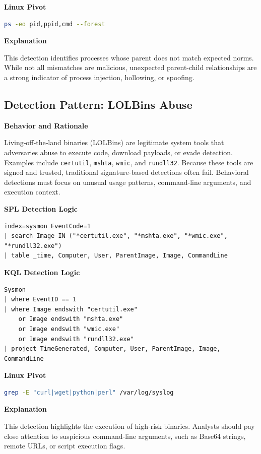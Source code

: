 \textbf{Linux Pivot}
\begin{lstlisting}[language=bash]
ps -eo pid,ppid,cmd --forest
\end{lstlisting}

\textbf{Explanation}

This detection identifies processes whose parent does not match expected norms. While not all mismatches are malicious, 
unexpected parent-child relationships are a strong indicator of process injection, hollowing, or spoofing.

\subsection*{Detection Pattern: LOLBins Abuse}

\textbf{Behavior and Rationale}

Living‑off‑the‑land binaries (LOLBins) are legitimate system tools that adversaries abuse to execute code, download payloads, 
or evade detection. Examples include \texttt{certutil}, \texttt{mshta}, \texttt{wmic}, and \texttt{rundll32}. 
Because these tools are signed and trusted, traditional signature-based detections often fail. Behavioral detections 
must focus on unusual usage patterns, command-line arguments, and execution context.

\textbf{SPL Detection Logic}
\begin{lstlisting}
index=sysmon EventCode=1
| search Image IN ("*certutil.exe", "*mshta.exe", "*wmic.exe", "*rundll32.exe")
| table _time, Computer, User, ParentImage, Image, CommandLine
\end{lstlisting}

\textbf{KQL Detection Logic}
\begin{lstlisting}
Sysmon
| where EventID == 1
| where Image endswith "certutil.exe"
    or Image endswith "mshta.exe"
    or Image endswith "wmic.exe"
    or Image endswith "rundll32.exe"
| project TimeGenerated, Computer, User, ParentImage, Image, CommandLine
\end{lstlisting}

\textbf{Linux Pivot}
\begin{lstlisting}[language=bash]
grep -E "curl|wget|python|perl" /var/log/syslog
\end{lstlisting}

\textbf{Explanation}

This detection highlights the execution of high‑risk binaries. Analysts should pay close attention to suspicious 
command-line arguments, such as Base64 strings, remote URLs, or script execution flags.

